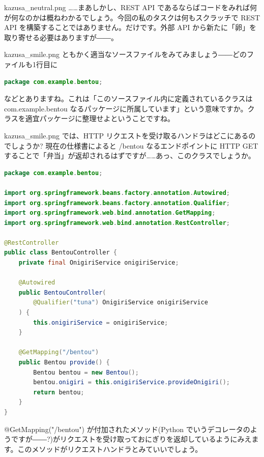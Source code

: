 \documentclass[b5paper,xelatex,ja=standard,10pt]{bxjsarticle}
\begin{document}
\begin{SERIFU}[colback=PaleIris, colbacktitle=PaleIris2]{kazusa_neutral.png}
……まあしかし、REST API であるならばコードをみれば何が何なのかは概ねわかるでしょう。今回の私のタスクは何もスクラッチで REST API を構築することではありません。{}だけです。外部 API から新たに「卵」を取り寄せる必要はありますが――。
\end{SERIFU}

\begin{SERIFU}[colback=PaleIris, colbacktitle=PaleIris2]{kazusa_smile.png}
ともかく適当なソースファイルをみてみましょう――どのファイルも1行目に
\begin{CODE}[title=\texttt{src/main/java/com/example/bentou/BentouApplication.java}]
\begin{lstlisting}[language=java]
package com.example.bentou;
\end{lstlisting}
\end{CODE}
などとありますね。これは「このソースファイル内に定義されているクラスは com.example.bentou なるパッケージに所属しています」という意味ですか。クラスを適宜パッケージに整理せよということですね。
\end{SERIFU}

\begin{SERIFU}[colback=PaleIris, colbacktitle=PaleIris2]{kazusa_smile.png}
では、HTTP リクエストを受け取るハンドラはどこにあるのでしょうか?  現在の仕様書によると {/bentou} なるエンドポイントに HTTP GET することで「弁当」が返却されるはずですが……あっ、このクラスでしょうか。
\begin{CODE}[title=\texttt{src/main/java/com/example/bentou/BentouController.java}]
\begin{lstlisting}[language=java,emph={@RestController,@Autowired,@Qualifier,@GetMapping},emphstyle=\color{VioletRed}]
package com.example.bentou;

import org.springframework.beans.factory.annotation.Autowired;
import org.springframework.beans.factory.annotation.Qualifier;
import org.springframework.web.bind.annotation.GetMapping;
import org.springframework.web.bind.annotation.RestController;

@RestController
public class BentouController {
    private final OnigiriService onigiriService;

    @Autowired
    public BentouController(
        @Qualifier("tuna") OnigiriService onigiriService
    ) {
        this.onigiriService = onigiriService;
    }

    @GetMapping("/bentou")
    public Bentou provide() {
        Bentou bentou = new Bentou();
        bentou.onigiri = this.onigiriService.provideOnigiri();
        return bentou;
    }
}
\end{lstlisting}
\end{CODE}
{@GetMapping}({"/bentou"}) が付加されたメソッド(Python でいうデコレータのようですが――?)がリクエストを受け取っておにぎりを返却しているようにみえます。このメソッドがリクエストハンドラとみていいでしょう。
\end{SERIFU}
\end{document}
